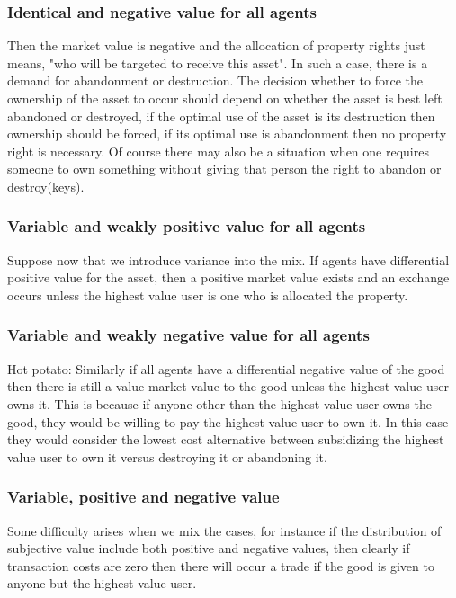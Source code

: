 \documentclass[12pt]{article}
\numberwithin{equation}{section}
\begin{document}
\subsubsection{Identical and negative value for all agents}

Then the market value is negative and the allocation of property rights just means,  "who will be targeted to receive this asset". In such a case, there is a demand for abandonment or destruction. The decision whether to force the ownership of the asset to occur should depend on whether the asset is best left abandoned or destroyed, if the optimal use of the asset is its destruction then ownership should be forced, if its optimal use is abandonment then no property right is necessary. Of course there may also be a situation when one requires someone to own something without giving that person the right to abandon or destroy(keys).

\subsubsection{Variable and weakly positive value for all agents}

Suppose now that we introduce variance into the mix. If agents have differential positive value for the asset, then a positive market value exists and an exchange occurs unless the highest value user is one who is allocated the property.

\subsubsection{Variable and weakly negative value for all agents}

Hot potato: Similarly if all agents have a differential negative value of the good then there is still a value market value to the good unless the highest value user owns it. This is because if anyone other than the highest value user owns the good, they would be willing to pay the highest value user to own it. In this case they would consider the lowest cost alternative between subsidizing the highest value user to own it versus destroying it or abandoning it.

\subsubsection{Variable, positive and negative value}

Some difficulty arises when we mix the cases, for instance if the distribution of subjective value include both positive and negative values, then clearly if transaction costs are zero then there will occur a trade if the good is given to anyone but the highest value user.
\end{document}
